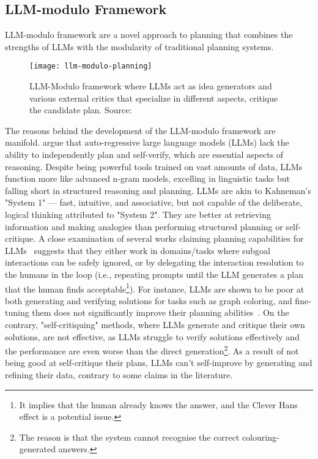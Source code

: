 \subsection{LLM-modulo Framework}
\label{subsec:llm-modulo}

LLM-modulo framework are a novel approach to planning that combines the strengths of LLMs with the modularity of traditional planning systems.

\begin{figure}
	\centering
	\texttt{[image: llm-modulo-planning]}
	\caption{LLM-Modulo framework where LLMs act as idea generators and various external critics that specialize in different aspects, critique the candidate plan. Source: \textcite{kambhampati2024llmscantplanhelp}}
	\label{fig:llm-modulo-framework}
\end{figure}

The reasons behind the development of the LLM-modulo framework are manifold.
\textcite{kambhampati2024llmscantplanhelp} argue that auto-regressive large language models (LLMs) lack the ability to independently plan and self-verify, which are essential aspects of reasoning.
Despite being powerful tools trained on vast amounts of data, LLMs function more like advanced n-gram models, excelling in linguistic tasks but falling short in structured reasoning and planning.
LLMs are akin to Kahneman's "System 1" — fast, intuitive, and associative, but not capable of the deliberate, logical thinking attributed to "System 2".
They are better at retrieving information and making analogies than performing structured planning or self-critique.
A close examination of several works claiming planning capabilities for LLMs~\cite{kambhampati2023role} suggests that they either work in domains/tasks where
subgoal interactions can be safely ignored, or by delegating the interaction resolution to the humans in the loop (i.e., repeating prompts until the LLM generates a plan that the human finds acceptable\footnote{It implies that the human already knows the answer, and the Clever Hans effect is a potential issue.}).
For instance, LLMs are shown to be poor at both generating and verifying solutions for tasks such as graph coloring, and fine-tuning them does not significantly improve their planning abilities~\cite{kahneman2011thinking}.
On the contrary, "self-critiquing" methods, where LLMs generate and critique their own solutions, are not effective, as LLMs struggle to verify solutions effectively and the performance are even worse than the direct generation\footnote{The reason is that the system cannot recognise the correct colouring-generated answers.}.
As a result of not being good at self-critique their plans, LLMs can't self-improve by generating and refining their data, contrary to some claims in the literature\cite{kambhampati2024llmscantplanhelp}.


